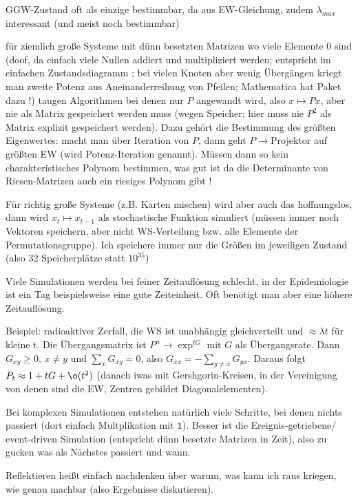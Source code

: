\documentclass[../KlassMech_main.tex]{subfiles}
\begin{document}
GGW-Zustand oft als einzige bestimmbar, da aus EW-Gleichung, zudem $\lambda_{max}$ interessant (und meist noch bestimmbar)

für ziemlich große Systeme mit dünn besetzten Matrizen wo viele Elemente 0 sind (doof, da einfach viele Nullen addiert und multipliziert werden; entspricht im einfachen Zustandsdiagramm ; bei vielen Knoten aber wenig Übergängen kriegt man zweite Potenz aus Aneinanderreihung von Pfeilen; Mathematica hat Paket dazu !) taugen Algorithmen bei denen nur $P$ angewandt wird, also $x \mapsto Px$, aber nie als Matrix gespeichert werden muss (wegen Speicher; hier muss nie $P^2$ als Matrix explizit gespeichert werden).
Dazu gehört die Bestimmung des größten Eigenwertes: macht man über Iteration von $P$, dann geht $P \rightarrow$Projektor auf größten EW (wird Potenz-Iteration genannt). Müssen dann so kein charakteristisches Polynom bestimmen, was gut ist da die Determinante von Riesen-Matrizen auch ein riesiges Polynom gibt !

Für richtig große Systeme (z.B. Karten mischen) wird aber auch das hoffnungslos, dann wird $x_t \mapsto x_{t-1}$ als stochastische Funktion simuliert (müssen immer noch Vektoren speichern, aber nicht WS-Verteilung bzw. alle Elemente der Permutationsgruppe). Ich speichere immer nur die Größen im jeweiligen Zustand (also 32 Speicherplätze statt $10^{35}$)


Viele Simulationen werden bei feiner Zeitauflösung schlecht, in der Epidemiologie ist ein Tag beispielsweise eine gute Zeiteinheit. Oft benötigt man aber eine höhere Zeitauflösung.

Beispiel: radioaktiver Zerfall, die WS ist unabhängig gleichverteilt und $\approx \lambda t$ für kleine t. Die Übergangsmatrix ist $P^n \rightarrow \exp^{tG}$ mit $G$ als Übergangsrate.
Dann $G_{xy} \geq 0, \, x\neq y$ und $\sum\limits_x G_{xy} = 0$, also $G_{xx} = - \sum\limits_{y\neq x} G_{yx}$. Daraus folgt $P_t \approx 1 + tG + \o(t^2)$ (danach iwas mit Gershgorin-Kreisen, in der Vereinigung von denen sind die EW, Zentren gebildet Diagonalelementen).

Bei komplexen Simulationen entstehen natürlich viele Schritte, bei denen nichts passiert (dort einfach Multplikation mit $\mathds{1}$). Besser ist die Ereignis-getriebene/ event-driven Simulation (entspricht dünn besetzte Matrizen in Zeit), also zu gucken was als Nächstes passiert und wann.


Reflektieren heißt einfach nachdenken über warum, was kann ich raus kriegen, wie genau machbar (also Ergebnisse diskutieren).
\end{document}
